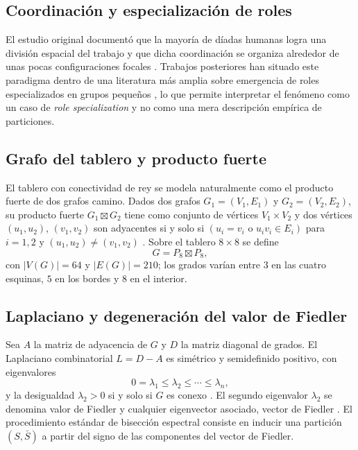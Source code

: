 \documentclass[journal]{IEEEtran}
\begin{document}
\subsection{Coordinación y especialización de roles}

El estudio original documentó que la mayoría de díadas humanas logra una división espacial del trabajo y que dicha coordinación se organiza alrededor de unas pocas configuraciones focales \cite{andrade2021}. Trabajos posteriores han situado este paradigma dentro de una literatura más amplia sobre emergencia de roles especializados en grupos pequeños \cite{goldstone2024}, lo que permite interpretar el fenómeno como un caso de \emph{role specialization} y no como una mera descripción empírica de particiones.

\subsection{Grafo del tablero y producto fuerte}

El tablero con conectividad de rey se modela naturalmente como el producto fuerte de dos grafos camino. Dados dos grafos $G_1=(V_1,E_1)$ y $G_2=(V_2,E_2)$, su producto fuerte $G_1 \boxtimes G_2$ tiene como conjunto de vértices $V_1\times V_2$ y dos vértices $(u_1,u_2)$, $(v_1,v_2)$ son adyacentes si y solo si $(u_i=v_i \text{ o } u_iv_i\in E_i)$ para $i=1,2$ y $(u_1,u_2)\neq (v_1,v_2)$ \cite{hammack2011}. Sobre el tablero $8\times 8$ se define
\[
G = P_8 \boxtimes P_8,
\]
con $|V(G)|=64$ y $|E(G)|=210$; los grados varían entre $3$ en las cuatro esquinas, $5$ en los bordes y $8$ en el interior.

\subsection{Laplaciano y degeneración del valor de Fiedler}

Sea $A$ la matriz de adyacencia de $G$ y $D$ la matriz diagonal de grados. El Laplaciano combinatorial $L = D - A$ es simétrico y semidefinido positivo, con eigenvalores
\[
0 = \lambda_1 \le \lambda_2 \le \cdots \le \lambda_n,
\]
y la desigualdad $\lambda_2 > 0$ si y solo si $G$ es conexo \cite{chung1997,vonluxburg2007}. El segundo eigenvalor $\lambda_2$ se denomina valor de Fiedler y cualquier eigenvector asociado, vector de Fiedler \cite{fiedler1973}. El procedimiento estándar de bisección espectral consiste en inducir una partición $(S,\bar S)$ a partir del signo de las componentes del vector de Fiedler.
\end{document}
